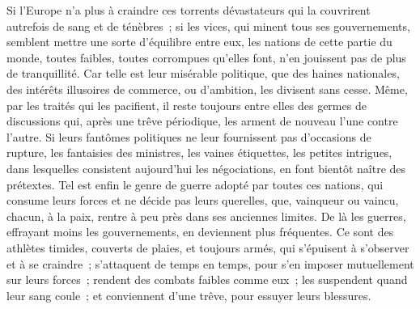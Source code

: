 \documentclass[french,twoside]{book} %
\begin{document}
Si l’Europe n’a plus à craindre ces torrents dévastateurs qui la couvrirent autrefois de sang et de ténèbres ; si les vices, qui minent tous ses gouvernements, semblent mettre une sorte d’équilibre entre eux, les nations de cette partie du monde, toutes faibles, toutes corrompues qu’elles font, n’en jouissent pas de plus de tranquillité. Car telle est leur misérable politique, que des haines nationales, des intérêts illusoires de commerce, ou d’ambition, les divisent sans cesse. Même, par les traités qui les pacifient, il reste toujours entre elles des germes de discussions qui, après une trêve périodique, les arment de nouveau l’une contre l’autre. Si leurs fantômes politiques ne leur fournissent pas d’occasions de rupture, les fantaisies des ministres, les vaines étiquettes, les petites intrigues, dans lesquelles consistent aujourd’hui les négociations, en font bientôt naître des prétextes. Tel est enfin le genre de guerre adopté par toutes ces nations, qui consume leurs forces et ne décide pas leurs querelles, que, vainqueur ou vaincu, chacun, à la paix, rentre à peu près dans ses anciennes limites. De là les guerres, effrayant moins les gouvernements, en deviennent plus fréquentes. Ce sont des athlètes timides, couverts de plaies, et toujours armés, qui s’épuisent à s’observer et à se craindre ; s’attaquent de temps en temps, pour s’en imposer mutuellement sur leurs forces ; rendent des combats faibles comme eux ; les suspendent quand leur sang coule ; et conviennent d’une trêve, pour essuyer leurs blessures.\par
\end{document}
